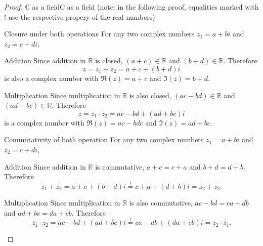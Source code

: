\begin{proof}{$\bm{\mathbb{C}}$ as a field}{C as a field}
	(note: in the following proof, equalities marked with $!$ use the respective propery of the real numbers)

	\begin{descitemize}
		\item[Closure under both operations] For any two complex numbers $z_{1}=a+bi$ and $z_{2}=c+di$,
			\begin{listitemize}
			\item[Addition] Since addition in $\mathbb{R}$ is closed, $(a+c)\in\mathbb{R}$ and $(b+d)\in\mathbb{R}$. Therefore
				\[
					z = z_{1}+z_{2} = a+c + (b+d)i
				\]
				is also a complex number with $\Re(z)=a+c$ and $\Im(z)=b+d$.
			\item[Multiplication] Since multiplication in $\mathbb{R}$ is also closed, $(ac-bd)\in\mathbb{R}$ and $(ad+bc)\in\mathbb{R}$. Therefore
				\[
					z = z_{1} \cdot z_{2} = ac-bd + (ad+bc)i
				\]
				is a complex number with $\Re(z)=ac-bdc$ and $\Im(z)=ad+bc$.
			\end{listitemize}
		
		\item[Commutativity of both operation] For any two complex numbers $z_{1}=a+bi$ and $z_{2}=c+di$,
			\begin{listitemize}
			\item[Addition] Since addition in $\mathbb{R}$ is commutative, $a+c=c+a$ and $b+d=d+b$. Therefore
				\[
					z_{1} + z_{2} = a+c + (b+d)i \overset{!}{=} c+a + (d+b)i = z_{2}+z_{2}.
				\]
			\item[Multiplication] Since multiplication in $\mathbb{R}$ is also commutative, $ac-bd = ca-db$ and $ad+bc=da+cb$. Therefore
				\[
					z_{1} \cdot z_{2} = ac-bd + (ad+bc)i \overset{!}{=} ca-db + (da+cb)i = z_{2} \cdot z_{1}.
				\]
			\end{listitemize}
		

\end{descitemize}
\end{proof}
